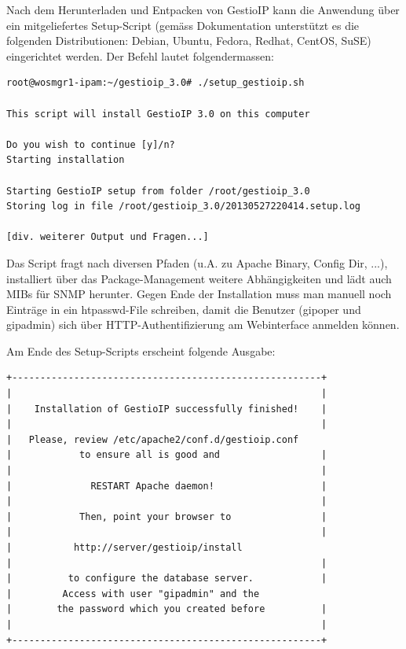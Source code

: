 \documentclass[11pt,a4paper,parskip=half]{scrartcl}
\begin{document}
Nach dem Herunterladen und Entpacken von GestioIP kann die Anwendung über ein mitgeliefertes Setup-Script (gemäss Dokumentation unterstützt es die folgenden Distributionen: Debian, Ubuntu, Fedora, Redhat, CentOS, SuSE) eingerichtet werden. Der Befehl lautet folgendermassen:

\begin{lstlisting}
root@wosmgr1-ipam:~/gestioip_3.0# ./setup_gestioip.sh 

This script will install GestioIP 3.0 on this computer

Do you wish to continue [y]/n? 
Starting installation

Starting GestioIP setup from folder /root/gestioip_3.0
Storing log in file /root/gestioip_3.0/20130527220414.setup.log

[div. weiterer Output und Fragen...]
\end{lstlisting}

Das Script fragt nach diversen Pfaden (u.A. zu Apache Binary, Config Dir, ...), installiert über das Package-Management weitere Abhängigkeiten und lädt auch MIBs für SNMP herunter. Gegen Ende der Installation muss man manuell noch Einträge in ein htpasswd-File schreiben, damit die Benutzer (gipoper und gipadmin) sich über HTTP-Authentifizierung am Webinterface anmelden können.

Am Ende des Setup-Scripts erscheint folgende Ausgabe:

\begin{lstlisting}
+-------------------------------------------------------+
|                                                       |
|    Installation of GestioIP successfully finished!    |
|                                                       |
|   Please, review /etc/apache2/conf.d/gestioip.conf
|            to ensure all is good and                  |
|                                                       |
|              RESTART Apache daemon!                   |
|                                                       |
|            Then, point your browser to                |
|                                                       |
|           http://server/gestioip/install
|                                                       |
|          to configure the database server.            |
|         Access with user "gipadmin" and the
|        the password which you created before          |
|                                                       |
+-------------------------------------------------------+
\end{lstlisting}
\end{document}
